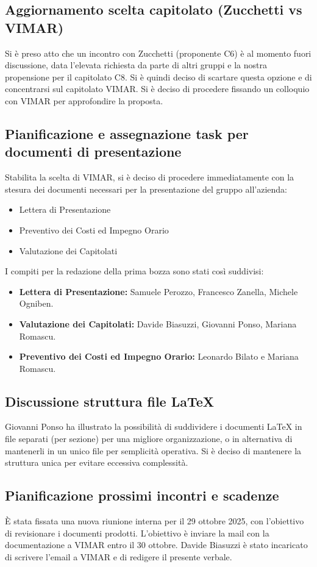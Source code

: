 \documentclass[a4paper, 11pt, oneside]{scrartcl} %
\begin{document}
\subsection{Aggiornamento scelta capitolato (Zucchetti vs VIMAR)}
Si è preso atto che un incontro con Zucchetti (proponente C6) è al momento fuori discussione, data l'elevata richiesta da parte di altri gruppi e la nostra propensione per il capitolato C8. 
Si è quindi deciso di scartare questa opzione e di concentrarsi sul capitolato VIMAR. 
Si è deciso di procedere fissando un colloquio con VIMAR per approfondire la proposta.

\subsection{Pianificazione e assegnazione task per documenti di presentazione}
Stabilita la scelta di VIMAR, si è deciso di procedere immediatamente con la stesura dei documenti necessari per la presentazione del gruppo all'azienda:
\begin{itemize}
    \item Lettera di Presentazione
    \item Preventivo dei Costi ed Impegno Orario
    \item Valutazione dei Capitolati
\end{itemize}
I compiti per la redazione della prima bozza sono stati così suddivisi:
\begin{itemize}
    \item \textbf{Lettera di Presentazione:} Samuele Perozzo, Francesco Zanella, Michele Ogniben.
    \item \textbf{Valutazione dei Capitolati:} Davide Biasuzzi, Giovanni Ponso, Mariana Romascu.
    \item \textbf{Preventivo dei Costi ed Impegno Orario:} Leonardo Bilato e Mariana Romascu.
\end{itemize}

\subsection{Discussione struttura file LaTeX}
Giovanni Ponso ha illustrato la possibilità di suddividere i documenti LaTeX in file separati (per sezione) per una migliore organizzazione, o in alternativa di mantenerli in un unico file per semplicità operativa. Si è deciso di mantenere la struttura unica per evitare eccessiva complessità.

\subsection{Pianificazione prossimi incontri e scadenze}
È stata fissata una nuova riunione interna per il 29 ottobre 2025, con l'obiettivo di revisionare i documenti prodotti. 
L'obiettivo è inviare la mail con la documentazione a VIMAR entro il 30 ottobre.
Davide Biasuzzi è stato incaricato di scrivere l'email a VIMAR e di redigere il presente verbale.
\end{document}
